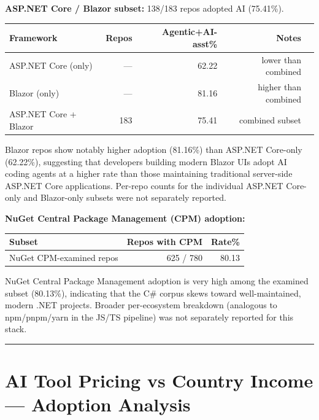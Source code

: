 \documentclass[10pt,a4paper]{article}
\begin{document}
\vspace{4pt}
\textbf{ASP.NET Core / Blazor subset:} 138/183 repos adopted AI (75.41\%).

\vspace{3pt}
\begin{tabular}{@{}lrrrr@{}}
\toprule
Framework & Repos & Agentic+AI-asst\% & Notes \\
\midrule
ASP.NET Core (only)   & --- & 62.22 & lower than combined \\
Blazor (only)         & --- & 81.16 & higher than combined \\
ASP.NET Core + Blazor & 183 & 75.41 & combined subset \\
\bottomrule
\end{tabular}

\vspace{4pt}
{\small Blazor repos show notably higher adoption (81.16\%) than ASP.NET Core-only (62.22\%),
suggesting that developers building modern Blazor UIs adopt AI coding agents at a higher rate
than those maintaining traditional server-side ASP.NET Core applications. Per-repo counts for
the individual ASP.NET Core-only and Blazor-only subsets were not separately reported.}

\vspace{6pt}
\textbf{NuGet Central Package Management (CPM) adoption:}

\vspace{3pt}
\begin{tabular}{@{}lrr@{}}
\toprule
Subset & Repos with CPM & Rate\% \\
\midrule
NuGet CPM-examined repos & 625 / 780 & 80.13 \\
\bottomrule
\end{tabular}

\vspace{4pt}
{\small NuGet Central Package Management adoption is very high among the examined subset
(80.13\%), indicating that the C\# corpus skews toward well-maintained, modern .NET projects.
Broader per-ecosystem breakdown (analogous to npm/pnpm/yarn in the JS/TS pipeline) was not
separately reported for this stack.}

\vspace{6pt}
\hrule
\vspace{6pt}

\newpage
\section*{AI Tool Pricing vs Country Income --- Adoption Analysis}
\end{document}
